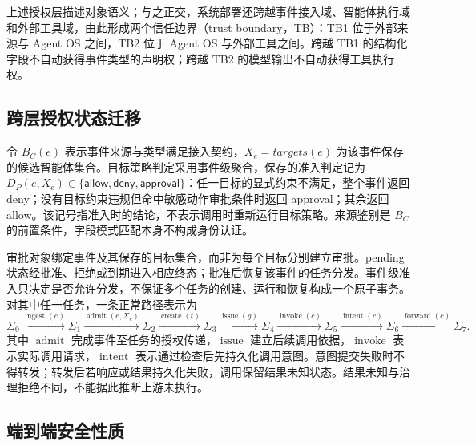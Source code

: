 上述授权层描述对象语义；与之正交，系统部署还跨越事件接入域、智能体执行域和外部工具域，由此形成两个信任边界（trust boundary，TB）：TB1 位于外部来源与 Agent OS 之间，TB2 位于 Agent OS 与外部工具之间。跨越 TB1 的结构化字段不自动获得事件类型的声明权；跨越 TB2 的模型输出不自动获得工具执行权。

\subsection{跨层授权状态迁移}

令 $B_C(e)$ 表示事件来源与类型满足接入契约，$X_e=targets(e)$ 为该事件保存的候选智能体集合。目标策略判定采用事件级聚合，保存的准入判定记为 $D_P(e,X_e)\in\{\mathsf{allow},\mathsf{deny},\mathsf{approval}\}$：任一目标的显式约束不满足，整个事件返回 deny；没有目标约束违规但命中敏感动作审批条件时返回 approval；其余返回 allow。该记号指准入时的结论，不表示调用时重新运行目标策略。来源鉴别是 $B_C$ 的前置条件，字段模式匹配本身不构成身份认证。

审批对象绑定事件及其保存的目标集合，而非为每个目标分别建立审批。pending 状态经批准、拒绝或到期进入相应终态；批准后恢复该事件的任务分发。事件级准入只决定是否允许分发，不保证多个任务的创建、运行和恢复构成一个原子事务。对其中任一任务，一条正常路径表示为
\begin{equation}
\Sigma_0 \xrightarrow{\operatorname{ingest}(e)}
\Sigma_1 \xrightarrow{\operatorname{admit}(e,X_e)}
\Sigma_2 \xrightarrow{\operatorname{create}(t)}
\Sigma_3 \xrightarrow{\operatorname{issue}(g)}
\Sigma_4 \xrightarrow{\operatorname{invoke}(c)}
\Sigma_5 \xrightarrow{\operatorname{intent}(c)}
\Sigma_6 \xrightarrow{\operatorname{forward}(c)} \Sigma_7 .
\label{eq:transition-v11}
\end{equation}
其中 $\operatorname{admit}$ 完成事件至任务的授权传递，$\operatorname{issue}$ 建立后续调用依据，$\operatorname{invoke}$ 表示实际调用请求，$\operatorname{intent}$ 表示通过检查后先持久化调用意图。意图提交失败时不得转发；转发后若响应或结果持久化失败，调用保留结果未知状态。结果未知与治理拒绝不同，不能据此推断上游未执行。

\subsection{端到端安全性质}

